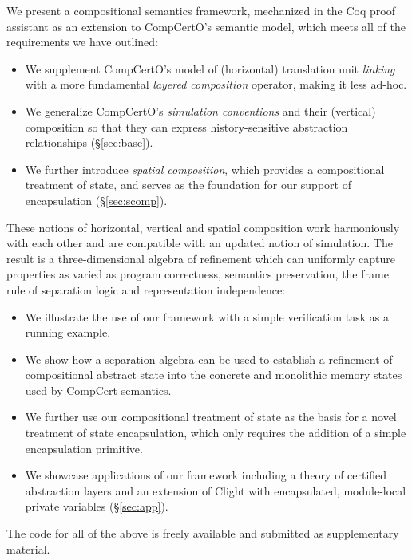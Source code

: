 \documentclass[acmsmall,screen,review,anonymous]{acmart}
\begin{document}
We present a compositional semantics framework,
mechanized in the Coq proof assistant
as an extension to CompCertO's semantic model,
which meets all of the requirements we have outlined:
\begin{itemize}
  \item We supplement CompCertO's model of (horizontal) translation unit \emph{linking}
    with a more fundamental \emph{layered composition} operator, making it less ad-hoc.
  \item We generalize CompCertO's \emph{simulation conventions} and their (vertical) composition
    so that they can express history-sensitive abstraction relationships (\S\ref{sec:base}).
  \item We further introduce \emph{spatial composition},
    which provides a compositional treatment of state,
    and serves as the foundation for our
    support of encapsulation (\S\ref{sec:scomp}).
\end{itemize}
These notions of horizontal, vertical and spatial composition
work harmoniously with each other and
are compatible with an updated notion of simulation.
The result is a
three-dimensional algebra of refinement
which can uniformly capture properties as varied as
program correctness,
semantics preservation,
the frame rule of separation logic and
representation independence:
\begin{itemize}
  \item We illustrate the use of our framework
    with a simple verification task as a running example.
  \item We show how a separation algebra
    can be used to establish a refinement of compositional abstract state
    into the concrete and monolithic memory states used by CompCert semantics.
  \item We further use our compositional treatment of state as
    the basis for a novel treatment of state encapsulation,
    which only requires the addition of a simple encapsulation primitive.
  \item We showcase applications of our framework
    including a theory of certified abstraction layers
    and an extension of Clight with encapsulated,
    module-local private variables (\S\ref{sec:app}).
\end{itemize}
The code for all of the above is freely available and
submitted as supplementary material.
\end{document}
